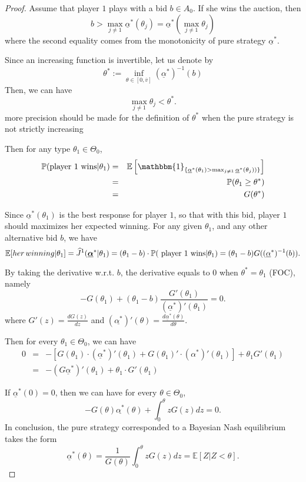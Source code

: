 \begin{proof}
	Assume that player $1$ plays with a bid $b \in A_0$. If she wins the auction, then
	$$
		b > \max_{j \neq 1}  \underline{\alpha}^*(\theta_j) = \underline{\alpha}^*( \max_{j \neq 1} \theta_j) 
	$$
	where the second equality comes from the monotonicity of pure strategy $\underline{\alpha}^*$.
	
	Since an increasing function is invertible, let us denote by 
	$$\theta^* := \inf_{\theta \in [0, \overline{v}]} (\underline{\alpha}^*)^{-1}(b)$$
	Then, we can have
	$$
		\max_{j \neq 1} \theta_j < \theta^* .
	$$
	{\color{red} more precision should be made for the definition of $\theta^*$ when the pure strategy is not strictly increasing}
		

	Then for any type $\theta_1 \in \Theta_0$,
	\begin{eqnarray}
		\mathbb{P}(\text{player 1 wins} | \theta_1) &=& \mathbb{E}\left[ \mathbbm{1}_{ \{\underline{\alpha}^*(\theta_1) > \max_{j \neq 1} \underline{\alpha}^*(\theta_j)) \} } \right] \nonumber \\
		&=& \mathbb{P}( \theta_1 \geq \theta^*  ) \\
		&=& G(\theta^*) 
	\end{eqnarray}
	
	Since $\underline{\alpha}^*(\theta_1)$ is the best response for player $1$, so that with this bid, player $1$ should maximizes her expected winning. For any given $\theta_1$, and any other alternative bid $b$, we have
	$$
	\mathbb{E}[her\, winning | \theta_1] = \widehat{J}^1(\underline{\boldsymbol{\alpha}}^* | \theta_1) = (\theta_1 - b) \cdot \mathbb{P}( \text{ player 1 wins} | \theta_1) = (\theta_1 - b) G( (\underline{\alpha}^*)^{-1}(b) ).
	$$
	
	
	By taking the derivative w.r.t. $b$, the derivative equals to $0$ when $\theta^* = \theta_1$ (FOC), namely
	$$
		- G( \theta_1) + (\theta_1 - b) \frac{ G'(\theta_1) }{ (\underline{\alpha}^*)' (\theta_1)}  = 0.
	$$
	where $G'(z) = \frac{d G(z)}{dz}$ and $(\underline{\alpha^*})' (\theta) = \frac{d \underline{\alpha}^*(\theta)}{d \theta}$.
	
	Then for every $\theta_1 \in \Theta_0$, we can have
	\begin{eqnarray*}
		0 &=& - \left[ G(\theta_1) \cdot (\underline{\alpha}^*)' (\theta_1) + G(\theta_1)' \cdot (\alpha^*)'(\theta_1) \right] + \theta_1 G'(\theta_1) \\
		&=& - \left( G \underline{\alpha}^* \right)' (\theta_1) + \theta_1 \cdot G'(\theta_1)
	\end{eqnarray*}
	
	If $\underline{\alpha}^*(0) = 0$, then we can have for every $\theta \in \Theta_0$,
	$$
		- G(\theta) \underline{\alpha^*}(\theta) + \int_0^\theta z G(z) dz = 0.
	$$
	In conclusion, the pure strategy corresponded to a Bayesian Nash equilibrium takes the form
	$$
		\underline{\alpha}^*(\theta) = \frac{1}{G(\theta) } \int_0^\theta z G(z) dz = \mathbb{E}[Z | Z < \theta].
	$$	
\end{proof}


